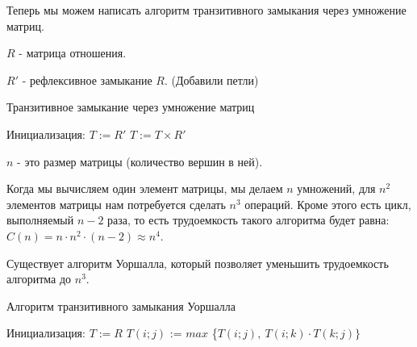 \documentclass[russian]{lecture-notes}
\begin{document}
Теперь мы можем написать алгоритм транзитивного замыкания через умножение матриц.

$R$ - матрица отношения.

$R'$ - рефлексивное замыкание $R$. (Добавили петли)
\begin{algorithm}[H]
	\caption{Транзитивное замыкание через умножение матриц}
	\begin{algorithmic}[1]
	    \Statex Инициализация:
	    \State $T := R'$
	        \State $T := T \times R'$
	    \EndFor
	\end{algorithmic}
\end{algorithm}

\begin{note}
    $n$ - это размер матрицы (количество вершин в ней).
    
    Когда мы вычисляем один элемент матрицы, мы делаем $n$ умножений, для $n^2$ элементов матрицы нам потребуется сделать $n^3$ операций. Кроме этого есть цикл, выполняемый $n-2$ раза, то есть трудоемкость такого алгоритма будет равна: $C(n)= n \cdot n^2 \cdot (n-2) \approx n^4$.
\end{note}

Существует алгоритм Уоршалла, который позволяет уменьшить трудоемкость алгоритма до $n^3$.

\begin{algorithm}[H]
	\caption{Алгоритм транзитивного замыкания Уоршалла}
	\begin{algorithmic}[1]
	    \Statex Инициализация:
	    \State $T := R$
	     
	         
    	            \State $T(i;j)$ := $max$ \{$T(i;j) , \ T(i;k) \cdot T(k;j)\}$ 
    	        \EndFor
	    \EndFor
	    \EndFor
	\end{algorithmic}
\end{algorithm}
\end{document}
